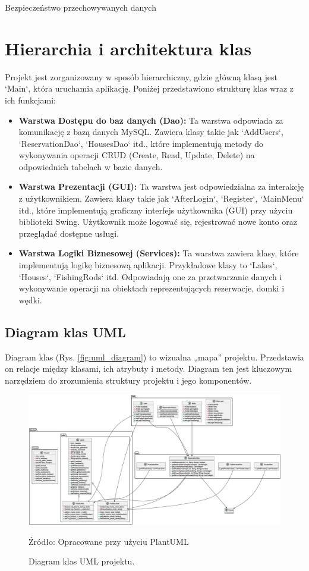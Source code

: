 Bezpieczeństwo przechowywanych danych

\section{Hierarchia i architektura klas}

Projekt jest zorganizowany w sposób hierarchiczny, gdzie główną klasą jest `Main`, która uruchamia aplikację. Poniżej przedstawiono strukturę klas wraz z ich funkcjami:

\begin{itemize}
    \item \textbf{Warstwa Dostępu do baz danych (Dao):} Ta warstwa odpowiada za komunikację z bazą danych MySQL. Zawiera klasy takie jak `AddUsers`, `ReservationDao`, `HousesDao` itd., które implementują metody do wykonywania operacji CRUD (Create, Read, Update, Delete) na odpowiednich tabelach w bazie danych.
    \item \textbf{Warstwa Prezentacji (GUI):} Ta warstwa jest odpowiedzialna za interakcję z użytkownikiem. Zawiera klasy takie jak `AfterLogin`, `Register`, `MainMenu` itd., które implementują graficzny interfejs użytkownika (GUI) przy użyciu biblioteki Swing. Użytkownik może logować się, rejestrować nowe konto oraz przeglądać dostępne usługi.
    \item \textbf{Warstwa Logiki Biznesowej (Services):} Ta warstwa zawiera klasy, które implementują logikę biznesową aplikacji. Przykładowe klasy to `Lakes`, `Houses`, `FishingRods` itd. Odpowiadają one za przetwarzanie danych i wykonywanie operacji na obiektach reprezentujących rezerwacje, domki i wędki.

\end{itemize}
\clearpage

\subsection{Diagram klas UML} 
Diagram klas (Rys. \ref{fig:uml_diagram}) to wizualna „mapa” projektu.
Przedstawia on relacje między klasami, ich atrybuty i metody. Diagram ten jest kluczowym narzędziem do zrozumienia struktury projektu i jego komponentów. 

\begin{figure}[H]
    \centering
    \includegraphics[width=1.1\linewidth]{figures/diagram.eps}
    \caption{Diagram klas UML projektu.}
    \label{fig:umldiagram}
    \small{Źródło: Opracowane przy użyciu PlantUML}
\end{figure}
\clearpage

